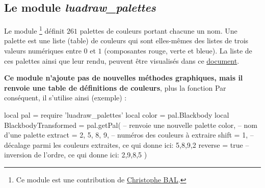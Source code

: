 \subsection{Le module \emph{luadraw\_palettes}}

Le module \footnote{Ce module est une contribution de \href{https://github.com/projetmbc/for-writing/tree/main/@prism}{Christophe BAL}.} définit $261$ palettes de couleurs portant chacune un nom. Une palette est une liste (table) de couleurs qui sont elles-mêmes des listes de trois valeurs numériques entre $0$ et $1$ (composantes rouge, verte et bleue). La liste de ces palettes ainsi que leur rendu, peuvent être visualisés dans ce \href{luadraw_palettes_list.pdf}{document}. 

\textbf{Ce module n'ajoute pas de nouvelles méthodes graphiques, mais il renvoie une table de définitions de couleurs}, plus la fonction  Par conséquent, il s'utilise ainsi (exemple) :
\begin{Luacode}
local pal = require 'luadraw_palettes'
local color = pal.Blackbody
local BlackbodyTransformed = pal.getPal( -- renvoie une nouvelle palette
    color, -- nom d'une palette
    {
    extract = {2, 5, 8, 9}, -- numéros des couleurs à extraire
    shift = 1, -- décalage parmi les couleurs extraites, ce qui donne ici: 5,8,9,2
    reverse = true -- inversion de l'ordre, ce qui donne ici: 2,9,8,5    
    }
)
\end{Luacode}
